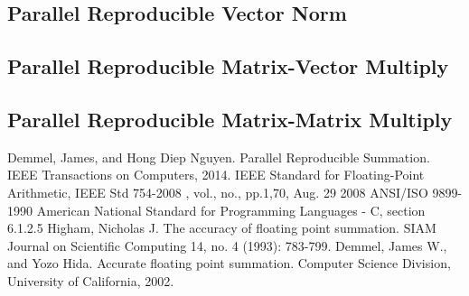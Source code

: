 \documentclass[12pt]{article}
\theoremstyle{definition}
\numberwithin{equation}{section}
\numberwithin{figure}{section}
\begin{document}
  \subsection{Parallel Reproducible Vector Norm}
  \subsection{Parallel Reproducible Matrix-Vector Multiply}
  \subsection{Parallel Reproducible Matrix-Matrix Multiply}
\begin{thebibliography}{9}
    Demmel, James, and Hong Diep Nguyen. Parallel Reproducible Summation. IEEE Transactions on Computers, 2014.
    IEEE Standard for Floating-Point Arithmetic, IEEE Std 754-2008 , vol., no., pp.1,70, Aug. 29 2008
    ANSI/ISO 9899-1990 American National Standard for Programming Languages - C, section 6.1.2.5
    Higham, Nicholas J. The accuracy of floating point summation. SIAM Journal on Scientific Computing 14, no. 4 (1993): 783-799.
    Demmel, James W., and Yozo Hida. Accurate floating point summation. Computer Science Division, University of California, 2002.
\end{thebibliography}
\end{document}
